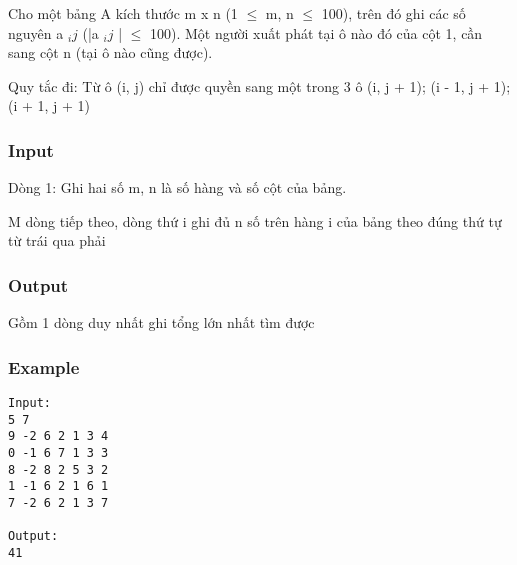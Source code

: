 



   Cho một bảng A kích thước m x n (1  $\le$  m, n  $\le$  100), trên đó ghi các số nguyên a   $_    ij   $   (|a   $_    ij   $   |  $\le$  100). Một người xuất phát tại ô nào đó của cột 1, cần sang cột n (tại ô nào cũng được).  

   Quy tắc đi: Từ ô (i, j) chỉ được quyền sang một trong 3 ô (i, j + 1); (i - 1, j + 1); (i + 1, j + 1)  

\subsubsection{   Input  }

   Dòng 1: Ghi hai số m, n là số hàng và số cột của bảng.  

   M dòng tiếp theo, dòng thứ i ghi đủ n số trên hàng i của bảng theo đúng thứ tự từ trái qua phải  

\subsubsection{   Output  }

   Gồm 1 dòng duy nhất ghi tổng lớn nhất tìm được  

\subsubsection{   Example  }
\begin{verbatim}
Input:
5 7
9 -2 6 2 1 3 4
0 -1 6 7 1 3 3
8 -2 8 2 5 3 2
1 -1 6 2 1 6 1
7 -2 6 2 1 3 7

Output:
41
\end{verbatim}
